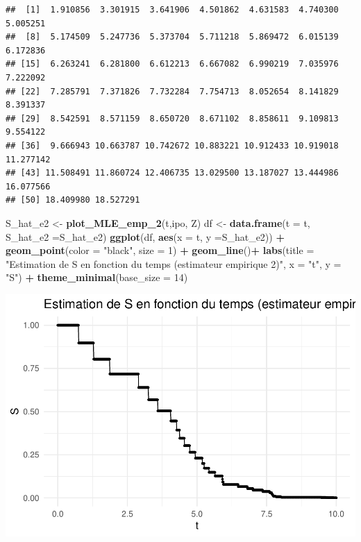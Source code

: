 \documentclass[
]{article}
\newenvironment{Shaded}{\begin{snugshade}}{\end{snugshade}}
\newcommand{\AttributeTok}[1]{\textcolor[rgb]{0.13,0.29,0.53}{#1}}
\newcommand{\DecValTok}[1]{\textcolor[rgb]{0.00,0.00,0.81}{#1}}
\newcommand{\FunctionTok}[1]{\textcolor[rgb]{0.13,0.29,0.53}{\textbf{#1}}}
\newcommand{\NormalTok}[1]{#1}
\newcommand{\OtherTok}[1]{\textcolor[rgb]{0.56,0.35,0.01}{#1}}
\newcommand{\SpecialCharTok}[1]{\textcolor[rgb]{0.81,0.36,0.00}{\textbf{#1}}}
\newcommand{\StringTok}[1]{\textcolor[rgb]{0.31,0.60,0.02}{#1}}
\begin{document}
\begin{verbatim}
##  [1]  1.910856  3.301915  3.641906  4.501862  4.631583  4.740300  5.005251
##  [8]  5.174509  5.247736  5.373704  5.711218  5.869472  6.015139  6.172836
## [15]  6.263241  6.281800  6.612213  6.667082  6.990219  7.035976  7.222092
## [22]  7.285791  7.371826  7.732284  7.754713  8.052654  8.141829  8.391337
## [29]  8.542591  8.571159  8.650720  8.671102  8.858611  9.109813  9.554122
## [36]  9.666943 10.663787 10.742672 10.883221 10.912433 10.919018 11.277142
## [43] 11.508491 11.860724 12.406735 13.029500 13.187027 13.444986 16.077566
## [50] 18.409980 18.527291
\end{verbatim}

\begin{Shaded}
\begin{Highlighting}[]
\NormalTok{S\_hat\_e2 }\OtherTok{\textless{}{-}} \FunctionTok{plot\_MLE\_emp\_2}\NormalTok{(t,ipo, Z)}
\NormalTok{df }\OtherTok{\textless{}{-}} \FunctionTok{data.frame}\NormalTok{(}\AttributeTok{t =}\NormalTok{ t, }\AttributeTok{S\_hat\_e2 =}\NormalTok{S\_hat\_e2)}
\FunctionTok{ggplot}\NormalTok{(df, }\FunctionTok{aes}\NormalTok{(}\AttributeTok{x =}\NormalTok{ t, }\AttributeTok{y =}\NormalTok{S\_hat\_e2)) }\SpecialCharTok{+}
  \FunctionTok{geom\_point}\NormalTok{(}\AttributeTok{color =} \StringTok{"black"}\NormalTok{, }\AttributeTok{size =} \DecValTok{1}\NormalTok{) }\SpecialCharTok{+}       
  \FunctionTok{geom\_line}\NormalTok{()}\SpecialCharTok{+}
  \FunctionTok{labs}\NormalTok{(}\AttributeTok{title =} \StringTok{"Estimation de S en fonction du temps (estimateur empirique 2)"}\NormalTok{,}
       \AttributeTok{x =} \StringTok{"t"}\NormalTok{,}
       \AttributeTok{y =} \StringTok{"S"}\NormalTok{) }\SpecialCharTok{+}
  \FunctionTok{theme\_minimal}\NormalTok{(}\AttributeTok{base\_size =} \DecValTok{14}\NormalTok{)}
\end{Highlighting}
\end{Shaded}

\includegraphics{Projet-Poisson_files/figure-latex/unnamed-chunk-9-1.pdf}
\end{document}
